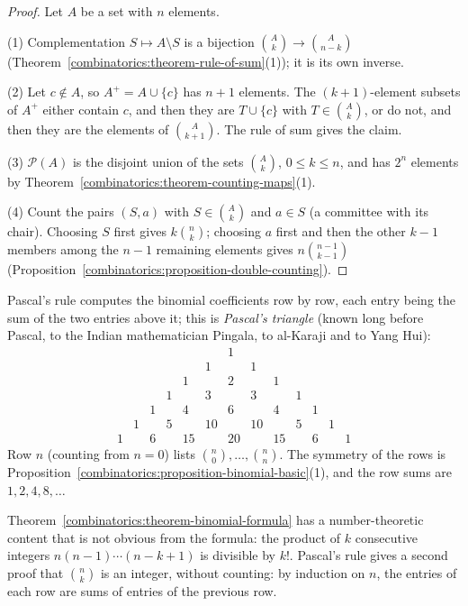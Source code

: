 \begin{proof}
Let $A$ be a set with $n$ elements.

(1) Complementation $S \mapsto A \setminus S$ is a bijection $\binom{A}{k} \to \binom{A}{n - k}$ (Theorem~\ref{combinatorics:theorem-rule-of-sum}(1)); it is its own inverse.

(2) Let $c \notin A$, so $A^{+} = A \cup \{c\}$ has $n + 1$ elements. The $(k + 1)$-element subsets of $A^{+}$ either contain $c$, and then they are $T \cup \{c\}$ with $T \in \binom{A}{k}$, or do not,
and then they are the elements of $\binom{A}{k+1}$. The rule of sum gives the claim.

(3) $\mathcal{P}(A)$ is the disjoint union of the sets $\binom{A}{k}$, $0 \leq k \leq n$, and has $2^n$ elements by Theorem~\ref{combinatorics:theorem-counting-maps}(1).

(4) Count the pairs $(S, a)$ with $S \in \binom{A}{k}$ and $a \in S$ (a committee with its chair). Choosing $S$ first gives $k\binom{n}{k}$; choosing $a$ first and then the other $k - 1$ members among the
$n - 1$ remaining elements gives $n\binom{n - 1}{k - 1}$ (Proposition~\ref{combinatorics:proposition-double-counting}).
\end{proof}

Pascal's rule computes the binomial coefficients row by row, each entry being the sum of the two entries above it; this is \emph{Pascal's triangle} (known long before Pascal, to the Indian
mathematician Pingala, to al-Karaji and to Yang Hui):
\[
\begin{array}{ccccccccccccc}
 & & & & & & 1 & & & & & & \\
 & & & & & 1 & & 1 & & & & & \\
 & & & & 1 & & 2 & & 1 & & & & \\
 & & & 1 & & 3 & & 3 & & 1 & & & \\
 & & 1 & & 4 & & 6 & & 4 & & 1 & & \\
 & 1 & & 5 & & 10 & & 10 & & 5 & & 1 & \\
1 & & 6 & & 15 & & 20 & & 15 & & 6 & & 1
\end{array}
\]
Row $n$ (counting from $n = 0$) lists $\binom{n}{0}, \ldots, \binom{n}{n}$. The symmetry of the rows is Proposition~\ref{combinatorics:proposition-binomial-basic}(1), and the row sums are $1, 2, 4, 8, \ldots$

\begin{remark}\label{combinatorics:remark-binomial-integer}
Theorem~\ref{combinatorics:theorem-binomial-formula} has a number-theoretic content that is not obvious from the formula: the product of $k$ consecutive integers $n(n - 1) \cdots (n - k + 1)$ is
divisible by $k!$. Pascal's rule gives a second proof that $\binom{n}{k}$ is an integer, without counting: by induction on $n$, the entries of each row are sums of entries of the previous row.
\end{remark}

